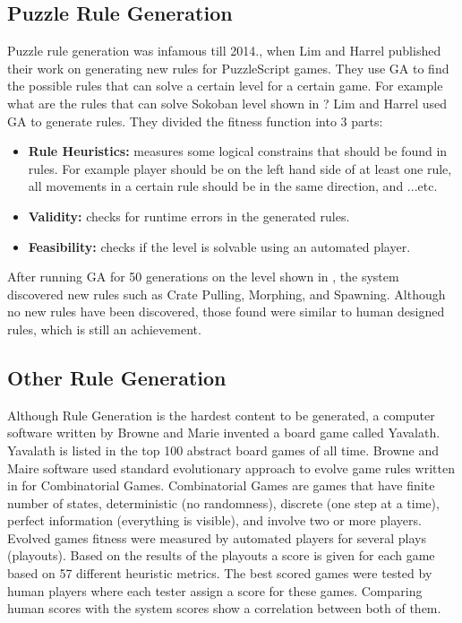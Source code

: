 \subsection{Puzzle Rule Generation}
Puzzle rule generation was infamous till 2014., when Lim and Harrel\cite{puzzleScriptGeneration} published their work on generating new rules for PuzzleScript games. They use GA to find the possible rules that can solve a certain level for a certain game. For example what are the rules that can solve Sokoban level shown in ? Lim and Harrel used GA to generate rules. They divided the fitness function into 3 parts:
\begin{itemize} \itemsep0pt \parskip0pt 
	\item \textbf{Rule Heuristics:} measures some logical constrains that should be found in rules. For example player should be on the left hand side of at least one rule, all movements in a certain rule should be in the same direction, and ...etc.
	\item \textbf{Validity:} checks for runtime errors in the generated rules.
	\item \textbf{Feasibility:} checks if the level is solvable using an automated player.
\end{itemize}
After running GA for 50 generations on the level shown in , the system discovered new rules such as Crate Pulling, Morphing, and Spawning. Although no new rules have been discovered, those found were similar to human designed rules, which is still an achievement.


\subsection{Other Rule Generation}
Although Rule Generation is the hardest content to be generated, a computer software written by Browne and Marie invented a board game called Yavalath. Yavalath is listed in the top 100 abstract board games of all time\cite{yavalath}. Browne and Maire software\cite{evolveBrowne} used standard evolutionary approach to evolve game rules written in  for Combinatorial Games. Combinatorial Games are games that have finite number of states, deterministic (no randomness), discrete (one step at a time), perfect information (everything is visible), and involve two or more players. Evolved games fitness were measured by automated players for several plays (playouts). Based on the results of the playouts a score is given for each game based on 57 different heuristic metrics. The best scored games were tested by human players where each tester assign a score for these games. Comparing human scores with the system scores show a correlation between both of them.\\\par

